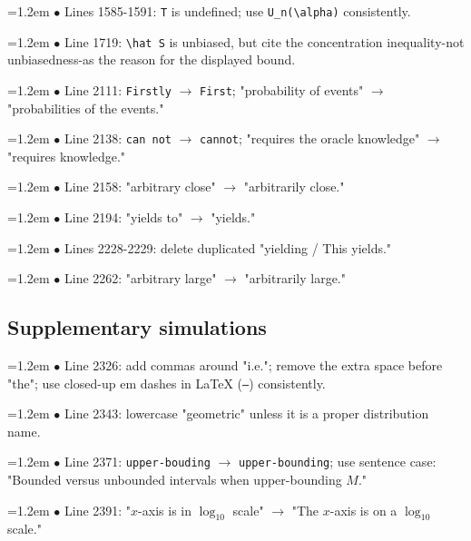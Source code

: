 \documentclass[10pt,a4paper]{article}
\begin{document}
\par\smallskip\noindent\hangindent=1.2em $\bullet$ Lines 1585-1591: \texttt{T} is undefined; use \texttt{U\_\allowbreak{}n(\textbackslash{}\allowbreak{}alpha)} consistently.
\par\smallskip\noindent\hangindent=1.2em $\bullet$ Line 1719: \texttt{\textbackslash{}\allowbreak{}hat S} is unbiased, but cite the concentration inequality-not unbiasedness-as the reason for the displayed bound.
\par\smallskip\noindent\hangindent=1.2em $\bullet$ Line 2111: \texttt{Firstly} $\to$ \texttt{First}; "probability of events" $\to$ "probabilities of the events."
\par\smallskip\noindent\hangindent=1.2em $\bullet$ Line 2138: \texttt{can not} $\to$ \texttt{cannot}; "requires the oracle knowledge" $\to$ "requires knowledge."
\par\smallskip\noindent\hangindent=1.2em $\bullet$ Line 2158: "arbitrary close" $\to$ "arbitrarily close."
\par\smallskip\noindent\hangindent=1.2em $\bullet$ Line 2194: "yields to" $\to$ "yields."
\par\smallskip\noindent\hangindent=1.2em $\bullet$ Lines 2228-2229: delete duplicated "yielding / This yields."
\par\smallskip\noindent\hangindent=1.2em $\bullet$ Line 2262: "arbitrary large" $\to$ "arbitrarily large."

\subsection*{Supplementary simulations}

\par\smallskip\noindent\hangindent=1.2em $\bullet$ Line 2326: add commas around "i.e."; remove the extra space before "the"; use closed-up em dashes in LaTeX (\texttt{---}) consistently.
\par\smallskip\noindent\hangindent=1.2em $\bullet$ Line 2343: lowercase "geometric" unless it is a proper distribution name.
\par\smallskip\noindent\hangindent=1.2em $\bullet$ Line 2371: \texttt{upper-bouding} $\to$ \texttt{upper-bounding}; use sentence case: "Bounded versus unbounded intervals when upper-bounding \(M\)."
\par\smallskip\noindent\hangindent=1.2em $\bullet$ Line 2391: "\(x\)-axis is in \(\log_{10}\) scale" $\to$ "The \(x\)-axis is on a \(\log_{10}\) scale."
\end{document}
